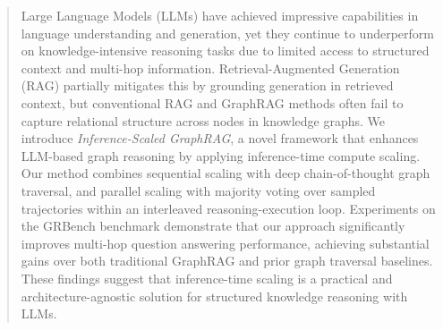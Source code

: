 \documentclass{article}
\begin{document}
\begin{abstract}
Large Language Models (LLMs) have achieved impressive capabilities in language understanding and generation, yet they continue to underperform on knowledge-intensive reasoning tasks due to limited access to structured context and multi-hop information. Retrieval-Augmented Generation (RAG) partially mitigates this by grounding generation in retrieved context, but conventional RAG and GraphRAG methods often fail to capture relational structure across nodes in knowledge graphs. We introduce \textit{Inference-Scaled GraphRAG}, a novel framework that enhances LLM-based graph reasoning by applying inference-time compute scaling. Our method combines sequential scaling with deep chain-of-thought graph traversal, and parallel scaling with majority voting over sampled trajectories within an interleaved reasoning-execution loop. Experiments on the GRBench benchmark demonstrate that our approach significantly improves multi-hop question answering performance, achieving substantial gains over both traditional GraphRAG and prior graph traversal baselines. These findings suggest that inference-time scaling is a practical and architecture-agnostic solution for structured knowledge reasoning with LLMs.
\end{abstract}



















\end{document}
